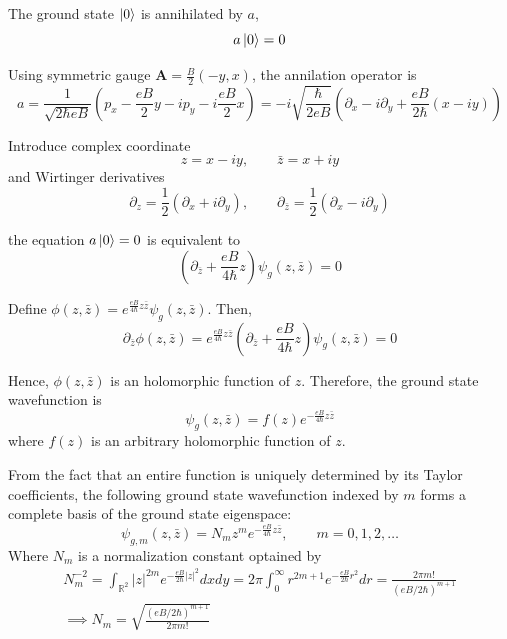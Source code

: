 \documentclass[a4paper,11pt]{article}
\begin{document}
The ground state $\ket{0}$ is annihilated by $a$,
\begin{equation}
  a \ket{0} = 0
\end{equation}

Using symmetric gauge $\mathbf{A} = \frac{B}{2}(-y, x)$, the annilation operator is
\begin{equation}
  a = \frac{1}{\sqrt{2\hbar eB}} \left( p_x - \frac{eB}{2}y - i p_y - i \frac{eB}{2}x \right) = -i\sqrt{\frac{\hbar}{2eB}} \left( \partial_x - i\partial_y + \frac{eB}{2\hbar}(x - iy) \right)
\end{equation}

Introduce complex coordinate 
\begin{equation}
  z = x - iy,\qquad \bar{z} = x + iy
\end{equation}
and Wirtinger derivatives
\begin{equation}
  \partial_z = \frac{1}{2}(\partial_x + i\partial_y),\qquad \partial_{\bar{z}} = \frac{1}{2}(\partial_x - i\partial_y)
\end{equation}

the equation $a \ket{0} = 0$ is equivalent to
\begin{equation}
  \left( \partial_{\bar{z}} + \frac{eB}{4\hbar} z \right) \psi_g(z, \bar{z}) = 0
\end{equation}

Define $\phi(z, \bar{z}) = e^{\frac{eB}{4\hbar}z\bar{z}}\psi_g(z, \bar{z})$. Then,
\begin{equation}
  \partial_{\bar{z}} \phi(z, \bar{z}) = e^{\frac{eB}{4\hbar}z\bar{z}} \left( \partial_{\bar{z}} + \frac{eB}{4\hbar} z \right) \psi_g(z, \bar{z}) = 0
\end{equation}

Hence, $\phi(z, \bar{z})$ is an holomorphic function of $z$. Therefore, the ground state wavefunction is
\begin{equation}
  \psi_g(z, \bar{z}) = f(z) e^{-\frac{eB}{4\hbar} z\bar{z}}
\end{equation}
where $f(z)$ is an arbitrary holomorphic function of $z$.

From the fact that an entire function is uniquely determined by its Taylor coefficients, the following ground state wavefunction indexed by $m$ forms a complete basis of the ground state eigenspace:
\begin{equation}
  \psi_{g, m}(z, \bar{z}) = N_m z^m e^{-\frac{eB}{4\hbar} z\bar{z}},\qquad m = 0, 1, 2, \ldots
\end{equation}
Where $N_m$ is a normalization constant optained by
\begin{gather}
  N_m^{-2} = \int_{\mathbb{R}^2} |z|^{2m} e^{-\frac{eB}{2\hbar}|z|^2} dx dy = 2\pi \int_0^\infty r^{2m + 1} e^{-\frac{eB}{2\hbar}r^2} dr = \frac{2\pi m!}{(eB / 2\hbar)^{m + 1}} \\
  \implies N_m = \sqrt{\frac{(eB / 2\hbar)^{m + 1}}{2\pi m!}}
\end{gather}
\end{document}
